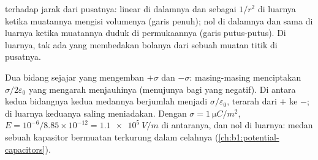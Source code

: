 \begin{omfigure}

{\small {} terhadap jarak dari pusatnya:
linear di dalamnya dan sebagai $1/r^2$ di luarnya ketika muatannya mengisi volumenya
(garis penuh); nol di dalamnya dan sama di luarnya ketika muatannya duduk di permukaannya
(garis putus-putus). Di luarnya, tak ada yang membedakan bolanya dari sebuah muatan titik
di pusatnya.}
\end{omfigure}

\begin{example}\label{ex:b1:electrostatics-gauss:twoplanes}
Dua bidang sejajar yang mengemban $+\sigma$ dan $-\sigma$: masing-masing menciptakan
$\sigma/2\varepsilon_0$ yang mengarah menjauhinya (menujunya bagi yang negatif).
Di antara kedua bidangnya kedua medannya berjumlah menjadi $\sigma/\varepsilon_0$, terarah dari
$+$ ke $-$; di luarnya keduanya saling meniadakan. Dengan $\sigma = \qty{1}{\micro C/m^2}$, $E =
10^{-6}/8.85 \times 10^{-12} = \qty{1.1e5}{V/m}$ di antaranya, dan nol di luarnya: medan
sebuah kapasitor bermuatan terkurung dalam celahnya
(\cref{ch:b1:potential-capacitors}).
\end{example}

